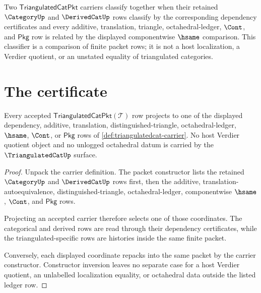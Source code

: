 \begin{definition}
\label{def:triangulatedcat-classifier}
Two $\mathsf{TriangulatedCatPkt}$ carriers classify together when their
retained $\CategoryUp$ and $\DerivedCatUp$ rows classify by the corresponding
dependency certificates and every additive, translation, triangle,
octahedral-ledger, $\Cont$, and $\mathsf{Pkg}$ row is related by the displayed
componentwise $\hsame$ comparison. This classifier is a comparison of finite
packet rows; it is not a host localization, a Verdier quotient, or an
unstated equality of triangulated categories.
\end{definition}

\section{The certificate}
\label{sec:triangulatedcat-certificate}

\begin{theorem}
\label{thm:triangulatedcat-carrier-obligation}
Every accepted $\mathsf{TriangulatedCatPkt}(\mathcal{T})$ row projects to one
of the displayed dependency, additive, translation, distinguished-triangle,
octahedral-ledger, $\hsame$, $\Cont$, or $\mathsf{Pkg}$ rows of
\autoref{def:triangulatedcat-carrier}. No host Verdier quotient object and no
unlogged octahedral datum is carried by the $\TriangulatedCatUp$ surface.
\end{theorem}
\begin{proof}
Unpack the carrier definition. The packet constructor lists the retained
$\CategoryUp$ and $\DerivedCatUp$ rows first, then the additive,
translation-autoequivalence, distinguished-triangle, octahedral-ledger,
componentwise $\hsame$, $\Cont$, and $\mathsf{Pkg}$ rows.

Projecting an accepted carrier therefore selects one of those coordinates.
The categorical and derived rows are read through their dependency
certificates, while the triangulated-specific rows are histories inside the
same finite packet.

Conversely, each displayed coordinate repacks into the same packet by the
carrier constructor. Constructor inversion leaves no separate case for a host
Verdier quotient, an unlabelled localization equality, or octahedral data
outside the listed ledger row.
\end{proof}

